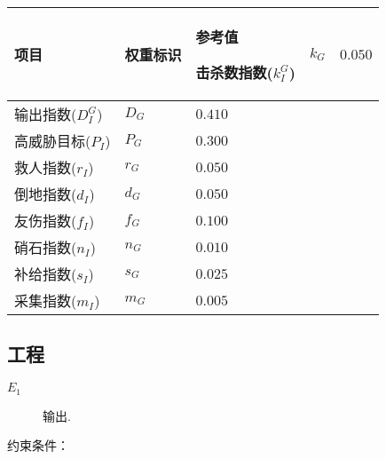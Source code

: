 \documentclass{ctexart}
\begin{document}
\begin{longtable}{|>{\centering\arraybackslash}p{8em}|>{\centering\arraybackslash}p{4em}|>{\centering\arraybackslash}p{6em}|}
    \hline

    项目             & 权重标识  & 参考值     \endhead

    \hline

    击杀数指数($k_I^G$) & $k_G$ & $0.050$          \\

    \hline

    输出指数($D_I^G$)  & $D_G$ & $0.410$          \\

    \hline

    高威胁目标($P_I$)   & $P_G$ & $0.300$          \\

    \hline

    救人指数($r_I$)    & $r_G$ & $0.050$          \\

    \hline

    倒地指数($d_I$)    & $d_G$ & $0.050$          \\

    \hline

    友伤指数($f_I$)    & $f_G$ & $0.100$          \\

    \hline

    硝石指数($n_I$)    & $n_G$ & $0.010$          \\

    \hline

    补给指数($s_I$)    & $s_G$ & $0.025$          \\

    \hline

    采集指数($m_I$)    & $m_G$ & $0.005$          \\

    \hline
\end{longtable}


\subsection{工程}

\begin{description}
    \item[$E_1$] 输出\cite{tieba-all}\cite{xiaoheihe-all}.
\end{description}

约束条件：
\end{document}
